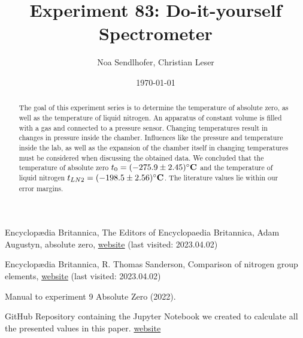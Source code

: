 \documentclass[12pt,a4paper]{article}
\title{Experiment 83: Do-it-yourself Spectrometer}
\author{Noa Sendlhofer, Christian Leser}
\date{\today}
\begin{document}
\maketitle

\begin{abstract}
    The goal of this experiment series is to determine the temperature of absolute zero, 
    as well as the temperature of liquid nitrogen. An apparatus of constant volume is filled with a gas
    and connected to a pressure sensor. Changing temperatures result in changes in pressure inside the chamber.
    Influences like the pressure and temperature inside the lab, as well as the expansion of the chamber itself
    in changing temperatures must be considered when discussing the obtained data. We concluded that the temperature
    of absolute zero $t_0 = (-275.9 \pm 2.45)\si{\bf\celsius}$ and the temperature of liquid nitrogen $t_{LN2} = (-198.5 \pm 2.56)\si{\bf\celsius}$.
    The literature values lie within our error margins.

\end{abstract}

\tableofcontents





\newpage








\begin{thebibliography}{99}

Encyclop\ae dia Britannica, The Editors of Encyclopaedia Britannica, Adam Augustyn, absolute zero, \href{https://www.britannica.com/science/absolute-zero}{website} (last visited: 2023.04.02)

Encyclop\ae dia Britannica, R. Thomas Sanderson, Comparison of nitrogen group elements, \href{https://www.britannica.com/science/nitrogen-group-element/Comparison-of-nitrogen-group-elements}{website} (last visited: 2023.04.02)

Manual to experiment 9 Absolute Zero (2022).

GitHub Repository containing the Jupyter Notebook we created to calculate all the presented values in this paper. \href{https://github.com/Noothless/Physik-Absolute-Zero}{website}

\end{thebibliography}
\end{document}
